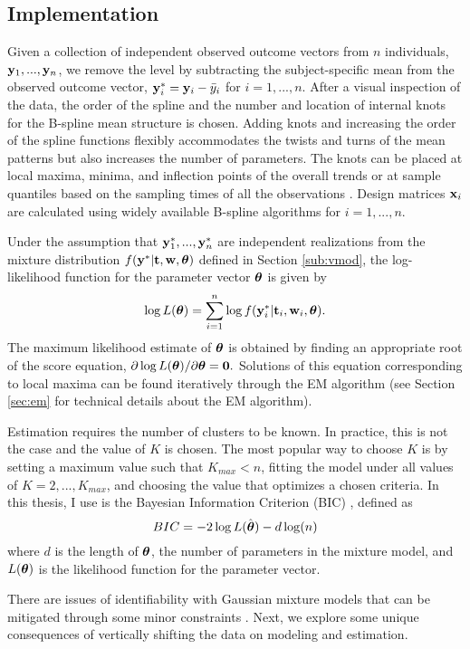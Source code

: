 \subsection{Implementation}
Given a collection of independent observed outcome vectors from $n$ individuals, $\mathbf y_{1},...,\mathbf y_{n}$, we remove the level by subtracting the subject-specific mean from the observed outcome vector, $\mathbf y^{*}_{i} = \mathbf y_{i} - \bar{y}_{i}$ for $i=1,...,n$. After a visual inspection of the data, the order of the spline and the number and location of internal knots for the B-spline mean structure is chosen. Adding knots and increasing the order of the spline functions flexibly accommodates the twists and turns of the mean patterns but also increases the number of parameters. The knots can be placed at local maxima, minima, and inflection points of the overall trends \cite{eubank1999} or at sample quantiles based on the sampling times of all the observations \cite{ruppert2002}. Design matrices $\mathbf x_{i}$ are calculated using widely available B-spline algorithms for $i=1,...,n$. 

Under the assumption that $\mathbf y^{*}_{1},...,\mathbf y^{*}_{n}$ are independent realizations from the mixture distribution $f(\mathbf y^{*} | \mathbf t, \mathbf w, \boldsymbol\theta)$ defined in Section \ref{sub:vmod}, the log-likelihood function for the parameter vector $\boldsymbol \theta$ is given by
$$\log L(\boldsymbol\theta)=\sum^{n}_{i=1}\log f(\mathbf y^{*}_{i}|\mathbf t_{i},\mathbf w_{i},\boldsymbol \theta).$$
The maximum likelihood estimate of $\boldsymbol\theta$ is obtained by finding an appropriate root of the score equation, $\partial \log L(\boldsymbol\theta)/\partial \boldsymbol\theta=\mathbf 0.$ Solutions of this equation corresponding to local maxima can be found iteratively through the EM algorithm \cite{dempster1977} (see Section \ref{sec:em} for technical details about the EM algorithm).

Estimation requires the number of clusters to be known. In practice, this is not the case and the value of $K$ is chosen. The most popular way to choose $K$ is by setting a maximum value such that $K_{max}<n$, fitting the model under all values of $K=2,...,K_{max}$, and choosing the value that optimizes a chosen criteria. In this thesis, I use is the Bayesian Information Criterion (BIC) \cite{schwarz1978}, defined as
$$BIC = -2\log L(\hat{\boldsymbol\theta})- d\log(n)$$
where $d$ is the length of $\boldsymbol\theta$, the number of parameters in the mixture model, and $L(\boldsymbol\theta)$ is the likelihood function for the parameter vector.

There are issues of identifiability with Gaussian mixture models that can be mitigated through some minor constraints \cite{mclachlan2000}. Next, we explore some unique consequences of vertically shifting the data on modeling and estimation.

